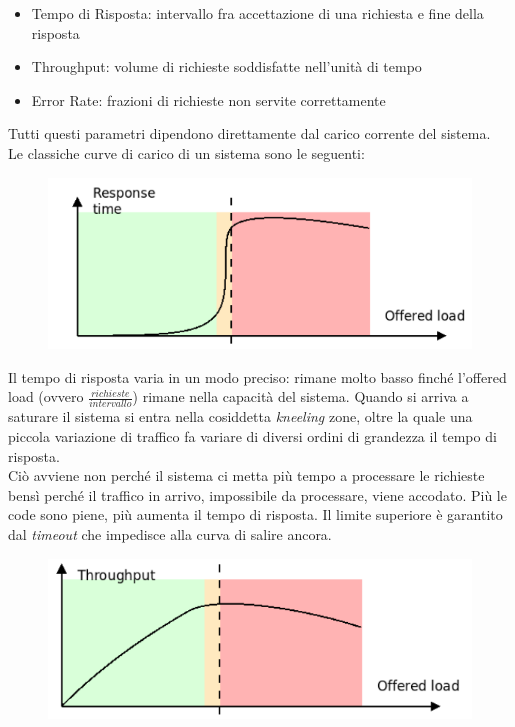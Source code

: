 \documentclass{article}
\begin{document}
		\begin{itemize}
			\item Tempo di Risposta: intervallo fra accettazione di una richiesta e fine della risposta
			\item Throughput: volume di richieste soddisfatte nell'unità di tempo
			\item Error Rate: frazioni di richieste non servite correttamente
		\end{itemize}
		
		Tutti questi parametri dipendono direttamente dal carico corrente del sistema.\\
		
		Le classiche curve di carico di un sistema sono le seguenti:
		\begin{figure}[ht]
			\centering
			\includegraphics[width=0.7\linewidth]{SAC_D1_load1}
			\label{fig:sacd1load1}
		\end{figure}
		
		Il tempo di risposta varia in un modo preciso: rimane molto basso finché l’offered load (ovvero $\frac{richieste}{intervallo}$) rimane nella capacità del sistema. Quando si arriva a saturare il sistema si entra nella cosiddetta \textit{kneeling} zone, oltre la quale una piccola variazione di traffico fa variare di diversi ordini di grandezza il tempo di risposta.\\
		Ciò avviene non perché il sistema ci metta più tempo a processare le richieste bensì perché il traffico in arrivo, impossibile da processare, viene accodato.
		Più le code sono piene, più aumenta il tempo di risposta. Il limite superiore è garantito dal \textit{timeout} che impedisce alla curva di salire ancora. 
		
		\begin{figure}[ht]
			\centering
			\includegraphics[width=0.7\linewidth]{SAC_D1_load2}
			\label{fig:sacd1load2}
		\end{figure}
		
\end{document}
